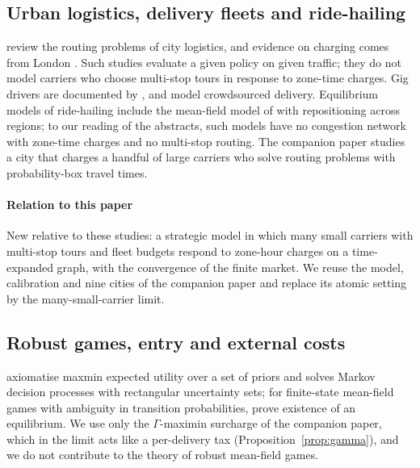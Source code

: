 \documentclass[preprint,11pt,authoryear]{elsarticle}
\theoremstyle{plain}
\theoremstyle{remark}
\begin{document}
\subsection{Urban logistics, delivery fleets and ride-hailing}\label{sec:rw-log}

\citet{Cattaruzza2017} review the routing problems of city logistics, and evidence on charging comes from London \citep{Leape2006}. Such studies evaluate a given policy on given traffic; they do not model carriers who choose multi-stop tours in response to zone-time charges. Gig drivers are documented by \citet{HallKrueger2018}, and \citet{Arslan2019} model crowdsourced delivery. Equilibrium models of ride-hailing include the mean-field model of \citet{LiDimakis2025} with repositioning across regions; to our reading of the abstracts, such models have no congestion network with zone-time charges and no multi-stop routing. The companion paper \citep{Omega2026} studies a city that charges a handful of large carriers who solve routing problems with probability-box travel times.

\paragraph{Relation to this paper} New relative to these studies: a strategic model in which many small carriers with multi-stop tours and fleet budgets respond to zone-hour charges on a time-expanded graph, with the convergence of the finite market. We reuse the model, calibration and nine cities of the companion paper and replace its atomic setting by the many-small-carrier limit.

\subsection{Robust games, entry and external costs}\label{sec:rw-entry}

\citet{GilboaSchmeidler1989} axiomatise maxmin expected utility over a set of priors and \citet{Iyengar2005} solves Markov decision processes with rectangular uncertainty sets; for finite-state mean-field games with ambiguity in transition probabilities, \citet{Langner2024} prove existence of an equilibrium. We use only the $\Gamma$-maximin surcharge of the companion paper, which in the limit acts like a per-delivery tax (Proposition~\ref{prop:gamma}), and we do not contribute to the theory of robust mean-field games.
\end{document}
